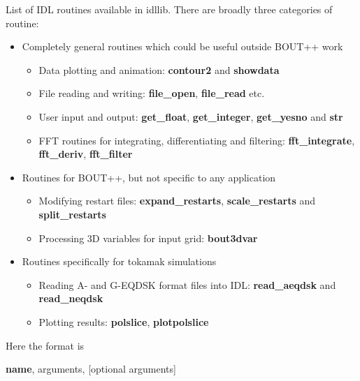 \documentclass[12pt]{article}
\begin{document}
List of IDL routines available in idllib. There are broadly three categories
of routine:
\begin{itemize}
\item Completely general routines which could be useful outside BOUT++ work
  \begin{itemize}
  \item Data plotting and animation: {\bf contour2} and {\bf showdata}
  \item File reading and writing: {\bf file\_open}, {\bf file\_read} etc.
  \item User input and output: {\bf get\_float}, {\bf get\_integer}, {\bf get\_yesno} and {\bf str}
  \item FFT routines for integrating, differentiating and filtering: {\bf fft\_integrate}, {\bf fft\_deriv}, {\bf fft\_filter}
  \end{itemize}
\item Routines for BOUT++, but not specific to any application
  \begin{itemize}
  \item Modifying restart files: {\bf expand\_restarts}, {\bf scale\_restarts} and {\bf split\_restarts}
  \item Processing 3D variables for input grid: {\bf bout3dvar}
  \end{itemize}
\item Routines specifically for tokamak simulations
  \begin{itemize}
  \item Reading A- and G-EQDSK format files into IDL: {\bf read\_aeqdsk} and {\bf read\_neqdsk}
  \item Plotting results: {\bf polslice}, {\bf plotpolslice}
  \end{itemize}
\end{itemize}

Here the format is

{\bf name}, arguments, [optional arguments]
\end{document}
